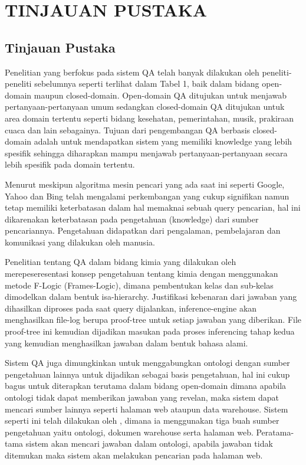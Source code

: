 \chapter{TINJAUAN PUSTAKA}
\section{Tinjauan Pustaka}
Penelitian yang berfokus pada sistem QA telah banyak dilakukan oleh peneliti-peneliti sebelumnya seperti terlihat dalam Tabel 1, baik dalam bidang open-domain maupun closed-domain. Open-domain QA ditujukan untuk menjawab pertanyaan-pertanyaan umum sedangkan closed-domain QA ditujukan untuk area domain tertentu seperti bidang kesehatan, pemerintahan, musik, prakiraan cuaca dan lain sebagainya. Tujuan dari pengembangan QA berbasis closed-domain adalah untuk mendapatkan sistem yang memiliki knowledge yang lebih spesifik sehingga diharapkan mampu menjawab pertanyaan-pertanyaan secara lebih spesifik pada domain tertentu.

Menurut \citet{zadeh} meskipun algoritma mesin pencari yang ada saat ini seperti Google, Yahoo dan Bing telah mengalami perkembangan yang cukup signifikan namun tetap memiliki keterbatasan dalam hal memaknai sebuah query pencarian, hal ini dikarenakan keterbatasan pada pengetahuan (knowledge) dari sumber pencariannya. Pengetahuan didapatkan dari pengalaman, pembelajaran dan komunikasi yang dilakukan oleh manusia.

Penelitian tentang QA dalam bidang kimia yang dilakukan oleh merepeseresentasi konsep pengetahuan tentang kimia dengan menggunakan metode F-Logic (Frames-Logic), dimana pembentukan kelas dan sub-kelas dimodelkan dalam bentuk isa-hierarchy. Justifikasi kebenaran dari jawaban yang dihasilkan diproses pada saat query dijalankan, inference-engine akan menghasilkan file-log berupa proof-tree untuk setiap jawaban yang diberikan. File proof-tree ini kemudian dijadikan masukan pada proses inferencing tahap kedua yang kemudian menghasilkan jawaban dalam bentuk bahasa alami.

Sistem QA juga dimungkinkan untuk menggabungkan ontologi dengan sumber pengetahuan lainnya untuk dijadikan sebagai basis pengetahuan, hal ini cukup bagus untuk diterapkan terutama dalam bidang open-domain dimana apabila ontologi tidak dapat memberikan jawaban yang revelan, maka sistem dapat mencari sumber lainnya seperti halaman web ataupun data warehouse. Sistem seperti ini telah dilakukan oleh \citet*{guo_zhang}, dimana ia menggunakan tiga buah sumber pengetahuan yaitu ontologi, dokumen warehouse serta halaman web. Peratama-tama sistem akan mencari jawaban dalam ontologi, apabila jawaban tidak ditemukan maka sistem akan melakukan pencarian pada halaman web.

